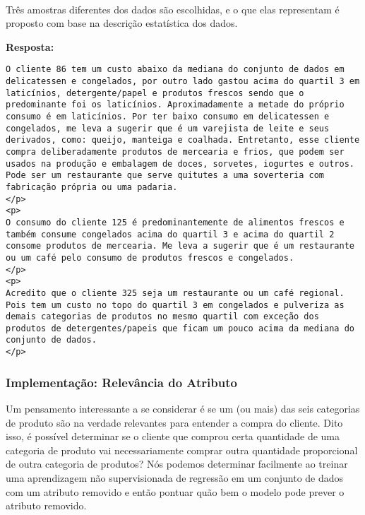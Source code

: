 \documentclass[11pt]{article}
\begin{document}
    \begin{center}
    \end{center}
    { \hspace*{\fill} \\}
    
     Três amostras diferentes dos dados são escolhidas, e o que elas
representam é proposto com base na descrição estatística dos dados. 

    \textbf{Resposta:}

\begin{verbatim}
O cliente 86 tem um custo abaixo da mediana do conjunto de dados em delicatessen e congelados, por outro lado gastou acima do quartil 3 em laticínios, detergente/papel e produtos frescos sendo que o predominante foi os laticínios. Aproximadamente a metade do próprio consumo é em laticínios. Por ter baixo consumo em delicatessen e congelados, me leva a sugerir que é um varejista de leite e seus derivados, como: queijo, manteiga e coalhada. Entretanto, esse cliente compra deliberadamente produtos de mercearia e frios, que podem ser usados na produção e embalagem de doces, sorvetes, iogurtes e outros. Pode ser um restaurante que serve quitutes a uma soverteria com fabricação própria ou uma padaria.
</p>
<p>
O consumo do cliente 125 é predominantemente de alimentos frescos e também consume congelados acima do quartil 3 e acima do quartil 2 consome produtos de mercearia. Me leva a sugerir que é um restaurante ou um café pelo consumo de produtos frescos e congelados.
</p>
<p>
Acredito que o cliente 325 seja um restaurante ou um café regional. Pois tem um custo no topo do quartil 3 em congelados e pulveriza as demais categorias de produtos no mesmo quartil com exceção dos produtos de detergentes/papeis que ficam um pouco acima da mediana do conjunto de dados. 
</p>
\end{verbatim}

    \subsubsection{Implementação: Relevância do
Atributo}\label{implementauxe7uxe3o-relevuxe2ncia-do-atributo}

Um pensamento interessante a se considerar é se um (ou mais) das seis
categorias de produto são na verdade relevantes para entender a compra
do cliente. Dito isso, é possível determinar se o cliente que comprou
certa quantidade de uma categoria de produto vai necessariamente comprar
outra quantidade proporcional de outra categoria de produtos? Nós
podemos determinar facilmente ao treinar uma aprendizagem não
supervisionada de regressão em um conjunto de dados com um atributo
removido e então pontuar quão bem o modelo pode prever o atributo
removido.
\end{document}
